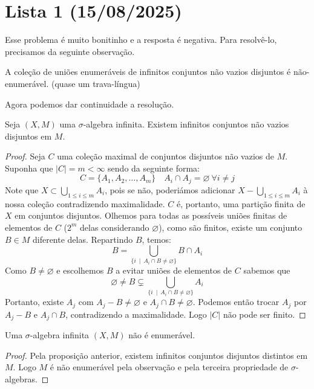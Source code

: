 \section{Lista 1 (15/08/2025)}

\prob
Esse problema é muito bonitinho e a resposta é negativa. Para resolvê-lo, precisamos da seguinte observação.
\begin{observation}
    A coleção de uniões enumeráveis de infinitos conjuntos não vazios disjuntos é não-enumerável. (quase um trava-língua)
\end{observation}
Agora podemos dar continuidade a resolução.
\begin{prop}
    Seja $(X,M)$ uma $\sigma$-algebra infinita. Existem infinitos conjuntos não vazios disjuntos em $M$.
\end{prop}
\begin{proof}
    Seja $C$ uma coleção maximal de conjuntos disjuntos não vazios de $M$. Suponha que $|C| = m < \infty$ sendo da seguinte forma:
    $$C = \{A_1, A_2, \dots, A_m \} \quad A_i \cap A_j = \varnothing \ \forall i\neq j$$
    Note que $X \subset \bigcup_{1 \leq i \leq m} A_i$, pois se não, poderiámos adicionar $X - \bigcup_{1 \leq i \leq m} A_i$ à nossa coleção contradizendo maximalidade.
    $C$ é, portanto, uma partição finita de $X$ em conjuntos disjuntos. Olhemos para todas as possíveis uniões finitas de elementos de $C$ ($2^m$ delas considerando $\varnothing$), 
    como são finitos, existe um conjunto $B \in M$ diferente delas. Repartindo $B$, temos:
    $$B = \bigcup_{\{i\ \mid \ A_i \cap B \neq \varnothing \}} B \cap A_i$$
    Como $B \neq \varnothing$ e escolhemos $B$ a evitar uniões de elementos de $C$ sabemos que
    $$\varnothing \neq B \subsetneq \bigcup_{\{i\ \mid \ A_i \cap B \neq \varnothing \}} A_i$$
    Portanto, existe $A_j$ com $A_j - B \neq \varnothing$ e $A_j \cap B \neq \varnothing$. Podemos então trocar $A_j$ por $A_j - B$ e $A_j \cap B$,
    contradizendo a maximalidade. Logo $|C|$ não pode ser finito.
\end{proof}
\begin{corollary}
    Uma $\sigma$-algebra infinita $(X,M)$ não é enumerável.
\end{corollary}
\begin{proof}
    Pela proposição anterior, existem infinitos conjuntos disjuntos distintos em $M$. Logo $M$ é não enumerável pela observação e pela terceira
    propriedade de $\sigma$-algebras.
\end{proof}

